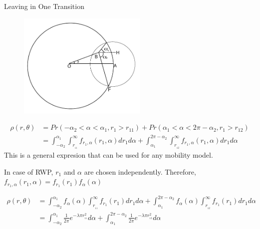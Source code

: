 \documentclass{beamer}
\begin{document}
\begin{frame}{Leaving in One Transition}{}
\begin{figure}[h]
	\centering \vspace{-0.1in}
	\includegraphics[width=0.55\textwidth]{images/a1a2.pdf}
\end{figure}
\vspace{-1cm}
\begin{align*}
	\rho(r,\theta) &= Pr(-\alpha_2 < \alpha < \alpha_1,r_1 > r_{11}) + Pr(\alpha_1 < \alpha < 2\pi-\alpha_2, r_1 > r_{12}) \\
	&= \int_{-\alpha_2}^{\alpha_1} \int_{r_{\!_{11}}}^{\infty} f_{r_1,\alpha}(r_1,\alpha)dr_1 d\alpha +  \int^{2\pi-\alpha_2}_{\alpha_1} \int_{r_{\!_{12}}}^{\infty} f_{r_1,\alpha}(r_1,\alpha)dr_1 d\alpha 
\end{align*}
	This is a general expresion that can be used for any mobility model. 
\end{frame}
\begin{frame}	
	
	In case of RWP,
	$r_1$ and $\alpha$ are chosen independently. Therefore, 
	$f_{r_1,\alpha}(r_1,\alpha) = f_{r_1}(r_1)f_{\alpha}(\alpha)$ 

\begin{align*}
	\rho(r,\theta)&= \int_{-\alpha_2}^{\alpha_1} f_{\alpha}(\alpha) \int_{r_{\!_{11}}}^{\infty} f_{r_1}(r_1)dr_1 d\alpha +  \int^{2\pi-\alpha_2}_{\alpha_1} f_{\alpha}(\alpha) \int_{r_{\!_{12}}}^{\infty} f_{r_1}(r_1)dr_1 d\alpha  \\
	&= \int_{-\alpha_2}^{\alpha_1} \frac{1}{2\pi} e^{-\lambda \pi r_{\!_{11}}^2} d\alpha +  \int^{2\pi-\alpha_2}_{\alpha_1} \frac{1}{2\pi} e^{-\lambda \pi r_{\!_{12}}^2} d\alpha
\end{align*}
\end{frame}
\end{document}
